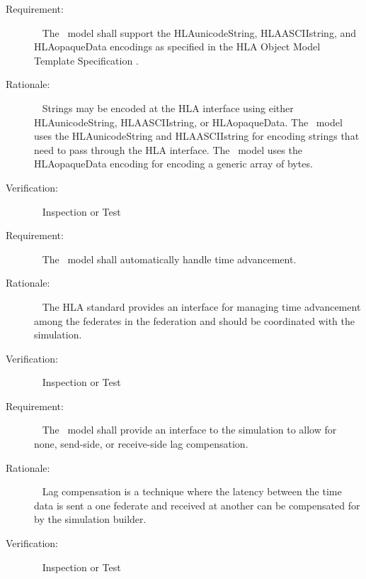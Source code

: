 \documentclass[twoside,11pt,titlepage]{report}
\begin{document}
\label{reqt:hla_encoding}
\begin{description}
  \item[Requirement:]\ \newline
    The \TrickHLA\ model shall support the HLAunicodeString,
    HLAASCIIstring, and HLAopaqueData encodings as specified in the
    HLA Object Model Template Specification \cite{IEEE1516:OMT}.

  \item[Rationale:]\ \newline
    Strings may be encoded at the HLA interface using either
    HLAunicodeString, HLAASCIIstring, or HLAopaqueData. The \TrickHLA\
    model uses the HLAunicodeString and HLAASCIIstring for encoding
    strings that need to pass through the HLA interface. The \TrickHLA\
    model uses the HLAopaqueData encoding for encoding a generic array
    of bytes.

  \item[Verification:]\ \newline
    Inspection or Test
\end{description}


\label{reqt:hla_time_advancement}
\begin{description}
  \item[Requirement:]\ \newline
    The \TrickHLA\ model shall automatically handle time advancement.

  \item[Rationale:]\ \newline
    The HLA standard provides an interface for managing time advancement
    among the federates in the federation and should be coordinated
    with the simulation.

  \item[Verification:]\ \newline
    Inspection or Test
\end{description}


\label{reqt:lag_compensation}
\begin{description}
  \item[Requirement:]\ \newline
    The \TrickHLA\ model shall provide an interface to the simulation
    to allow for none, send-side, or receive-side lag compensation.

  \item[Rationale:]\ \newline
    Lag compensation is a technique where the latency between the time
    data is sent a one federate and received at another can be compensated
    for by the simulation builder.

  \item[Verification:]\ \newline
    Inspection or Test
\end{description}
\end{document}
